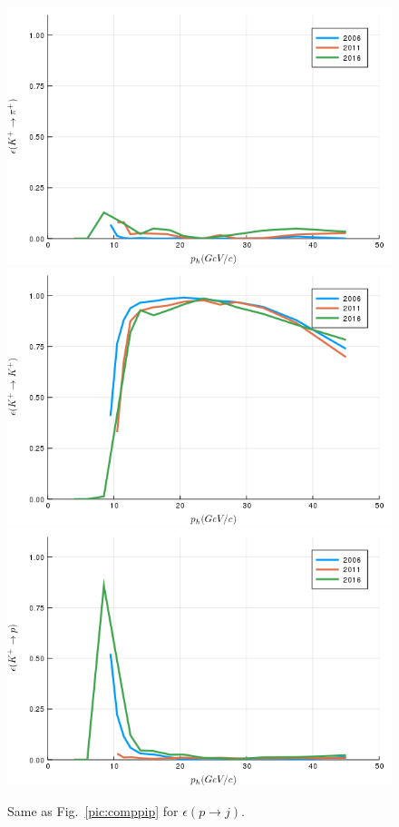 \begin{figure}[!p]
  \centering
	\includegraphics[scale=0.35]{./gfx/t1/kp2pip.png}
  \includegraphics[scale=0.35]{./gfx/t1/kp2kp.png}
  \includegraphics[scale=0.35]{./gfx/t1/kp2pp.png}
	\caption{Same as Fig.~\ref{pic:comppip} for $\epsilon(p \rightarrow j)$.}
	\label{pic:compkp}
\end{figure}

